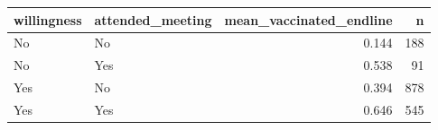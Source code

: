 
\begin{tabular}{llrr}
\toprule
willingness & attended\_meeting & mean\_vaccinated\_endline & n\\
\midrule
No & No & 0.144 & 188\\
No & Yes & 0.538 & 91\\
Yes & No & 0.394 & 878\\
Yes & Yes & 0.646 & 545\\
\bottomrule
\end{tabular}

